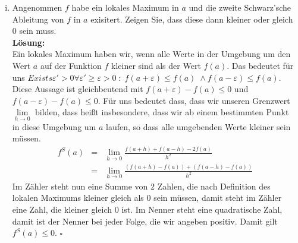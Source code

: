 \documentclass[11pt,a4paper,ngerman]{article}
\begin{document}
\begin{enumerate}[(i)]
    \item Angenommen $f$ habe ein lokales Maximum in $a$ und die zweite Schwarz'sche Ableitung von $f$
        in $a$ exisitert. Zeigen Sie, dass diese dann kleiner oder gleich 0 sein muss.\\
    \textbf{Lösung:}\\
        Ein lokales Maximum haben wir, wenn alle Werte in der Umgebung um den Wert $a$ auf der Funktion $f$
        kleiner sind als der Wert $f(a)$. Das bedeutet für uns
        $Exists \varepsilon' > 0 \forall \varepsilon' \geq \varepsilon > 0 \; : \; f(a +\varepsilon) \leq f(a) \; \land f(a - \varepsilon) \leq f(a)$. Diese Aussage ist gleichbeutend mit $f(a+\varepsilon)-f(a) \leq 0$
        und $f(a - \varepsilon) - f(a) \leq 0$.
        Für uns bedeutet dass, dass wir unseren Grenzwert $\underset{h \rightarrow 0}{\lim}$ bilden, dass
        heißt insbesondere, dass wir ab einem bestimmten Punkt in diese Umgebung um $a$ laufen,
        so dass alle umgebenden Werte kleiner sein müssen.\\
        $$\begin{array}{rcl}
            f^S(a) &=& \underset{h \rightarrow 0}{\lim} \frac{f(a+h) + f(a-h) - 2f(a)}{h^2}\\
                &=& \underset{h \rightarrow 0}{\lim} \frac{(f(a+h) - f(a)) + (f(a-h) - f(a))}{h^2}
        \end{array}$$
        Im Zähler steht nun eine Summe von 2 Zahlen, die nach Definition des lokalen Maximums kleiner
        gleich als $0$ sein müssen, damit steht im Zähler eine Zahl, die kleiner gleich 0 ist.
        Im Nenner steht eine quadratische Zahl, damit ist der Nenner bei jeder Folge, die wir angeben
        positiv. Damit gilt $f^S(a) \leq 0$.
        \mbox{}\hfill $\square$
\end{enumerate}

\label{LastPage}
\end{document}
